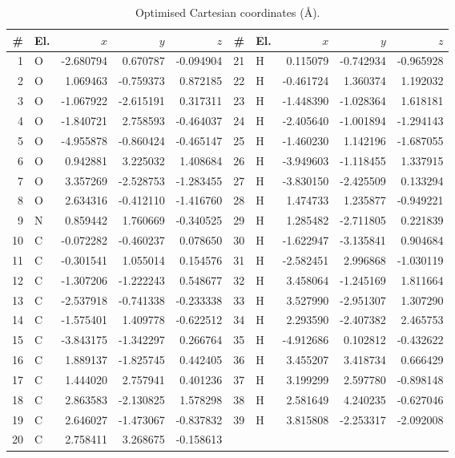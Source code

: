 \documentclass[11pt,a4paper]{article}
\begin{document}
\begin{table}[htbp]\centering
\caption{Optimised Cartesian coordinates (\AA).}
\small
\begin{tabular}{rlrrr@{\hskip 2em}rlrrr}
\toprule
\# & El. & $x$ & $y$ & $z$ & \# & El. & $x$ & $y$ & $z$ \\
\midrule
1 & O & -2.680794 & 0.670787 & -0.094904 & 21 & H & 0.115079 & -0.742934 & -0.965928 \\
2 & O & 1.069463 & -0.759373 & 0.872185 & 22 & H & -0.461724 & 1.360374 & 1.192032 \\
3 & O & -1.067922 & -2.615191 & 0.317311 & 23 & H & -1.448390 & -1.028364 & 1.618181 \\
4 & O & -1.840721 & 2.758593 & -0.464037 & 24 & H & -2.405640 & -1.001894 & -1.294143 \\
5 & O & -4.955878 & -0.860424 & -0.465147 & 25 & H & -1.460230 & 1.142196 & -1.687055 \\
6 & O & 0.942881 & 3.225032 & 1.408684 & 26 & H & -3.949603 & -1.118455 & 1.337915 \\
7 & O & 3.357269 & -2.528753 & -1.283455 & 27 & H & -3.830150 & -2.425509 & 0.133294 \\
8 & O & 2.634316 & -0.412110 & -1.416760 & 28 & H & 1.474733 & 1.235877 & -0.949221 \\
9 & N & 0.859442 & 1.760669 & -0.340525 & 29 & H & 1.285482 & -2.711805 & 0.221839 \\
10 & C & -0.072282 & -0.460237 & 0.078650 & 30 & H & -1.622947 & -3.135841 & 0.904684 \\
11 & C & -0.301541 & 1.055014 & 0.154576 & 31 & H & -2.582451 & 2.996868 & -1.030119 \\
12 & C & -1.307206 & -1.222243 & 0.548677 & 32 & H & 3.458064 & -1.245169 & 1.811664 \\
13 & C & -2.537918 & -0.741338 & -0.233338 & 33 & H & 3.527990 & -2.951307 & 1.307290 \\
14 & C & -1.575401 & 1.409778 & -0.622512 & 34 & H & 2.293590 & -2.407382 & 2.465753 \\
15 & C & -3.843175 & -1.342297 & 0.266764 & 35 & H & -4.912686 & 0.102812 & -0.432622 \\
16 & C & 1.889137 & -1.825745 & 0.442405 & 36 & H & 3.455207 & 3.418734 & 0.666429 \\
17 & C & 1.444020 & 2.757941 & 0.401236 & 37 & H & 3.199299 & 2.597780 & -0.898148 \\
18 & C & 2.863583 & -2.130825 & 1.578298 & 38 & H & 2.581649 & 4.240235 & -0.627046 \\
19 & C & 2.646027 & -1.473067 & -0.837832 & 39 & H & 3.815808 & -2.253317 & -2.092008 \\
20 & C & 2.758411 & 3.268675 & -0.158613 &  & & & &  \\
\bottomrule
\end{tabular}\end{table}
\end{document}
